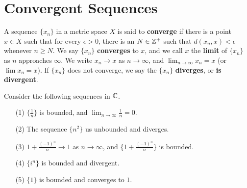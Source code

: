 
\section{Convergent Sequences}

\begin{definition}
    A sequence $\{x_n\}$ in a metric space  $X$ is said to \textbf{converge} if there is
    a point $x \in X$ such that for every  $\epsilon>0$, there is an  $ N \in \mathbb{Z}^+$ such that
    $d(x_n,x)<\epsilon$ whenever $n \geq N$. We say $\{x_n\}$ \textbf{converges} to $x$, and we
    call  $x$ the \textbf{limit} of  $\{x_n\}$ as  $n$ approaches  $\infty$. We write
    $x_n \rightarrow x$ as $n \rightarrow \infty$, and  $\lim_{n \rightarrow \infty}{x_n}=x$  (or $\lim{x_n}=x$).
    If $\{x_n\}$ does not converge, we say the  $\{x_n\}$ \textbf{diverges}, or \textbf{is divergent}.
\end{definition}

\begin{example}
    Consider the following sequences in $\mathbb{C}$.
        \begin{enumerate}
            \item[(1)] $\{\frac{1}{n}\}$ is bounded, and $\lim_{n \rightarrow \infty}{ \frac{1}{n}}=0$.

            \item[(2)] The sequence $\{n^2\}$ us unbounded and diverges.

            \item[(3)] $1+\frac{(-1)^n}{n} \rightarrow 1$ as $n \rightarrow \infty$, and  $\{1+\frac{(-1)^n}{n}\}$ is bounded.

            \item[(4)] $\{i^n\}$ is bounded and divergent.

            \item[(5)] $\{1\}$ is bounded and converges to  $1$.
        \end{enumerate}
\end{example}

